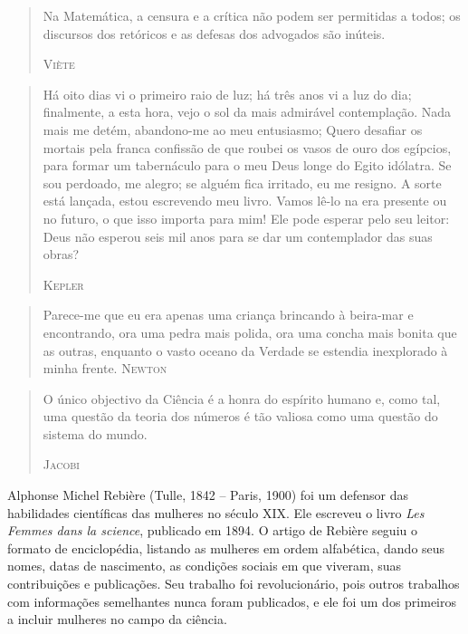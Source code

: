 \documentclass{hipatia}
\begin{document}
\begin{quote}
Na Matemática, a censura e a crítica não podem ser permitidas a todos; os discursos dos retóricos e as defesas dos advogados são inúteis.

\hfill \textsc{Viète}
\end{quote}
 
\begin{quote}
Há oito dias vi o primeiro raio de luz; há três anos vi a luz do dia; finalmente, a esta hora, vejo o sol da mais admirável contemplação. Nada mais me detém, abandono-me ao meu entusiasmo; Quero desafiar os mortais pela franca confissão de que roubei os vasos de ouro dos egípcios, para formar um tabernáculo para o meu Deus longe do Egito idólatra. Se sou perdoado, me alegro; se alguém fica irritado, eu me resigno. A sorte está lançada, estou escrevendo meu livro. Vamos lê-lo na era presente ou no futuro, o que isso importa para mim! Ele pode esperar pelo seu leitor: Deus não esperou seis mil anos para se dar um contemplador das suas obras?

\hfill \textsc{Kepler}
\end{quote}

\begin{quote}
Parece-me que eu era apenas uma criança brincando à beira-mar e encontrando, ora uma pedra mais polida, ora uma concha mais bonita que as outras, enquanto o vasto oceano da Verdade se estendia inexplorado à minha frente.
\hfill \textsc{Newton}
\end{quote}

 
\begin{quote} 
O único objectivo da Ciência é a honra do espírito humano e, como tal, uma questão da teoria dos números é tão valiosa como uma questão do sistema do mundo.

\hfill \textsc{Jacobi}
\end{quote}

 


\vfill

Alphonse Michel Rebière (Tulle, 1842 – Paris, 1900) foi um defensor das habilidades científicas das mulheres no século XIX. Ele escreveu o livro \emph{Les Femmes dans la science}, publicado em 1894. O artigo de Rebière seguiu o formato de enciclopédia, listando as mulheres em ordem alfabética, dando seus nomes, datas de nascimento, as condições sociais em que viveram, suas contribuições e publicações. Seu trabalho foi revolucionário, pois outros trabalhos com informações semelhantes nunca foram publicados, e ele foi um dos primeiros a incluir mulheres no campo da ciência.
\end{document}
